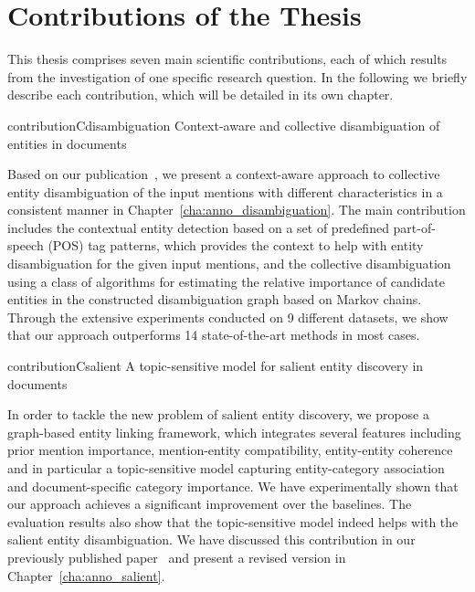\section{Contributions of the Thesis}


This thesis comprises seven main scientific contributions, each of which results from the investigation of one specific research question. In the following we briefly describe each contribution, which will be detailed in its own chapter.

\begin{restatable}{contribution}{Cdisambiguation} \label{c:disambiguation}
Context-aware and collective disambiguation of entities in documents
\end{restatable}
\noindent Based on our publication~\cite{}, we present a context-aware approach to collective entity disambiguation of the input mentions with different characteristics in a consistent manner in Chapter~\ref{cha:anno_disambiguation}. 
The main contribution includes the contextual entity detection based on a set of predefined part-of-speech (POS) tag patterns, which provides the context to help with entity disambiguation for the given input mentions, and the collective disambiguation using a class of algorithms for estimating the relative importance of candidate entities in the constructed disambiguation graph based on Markov chains.
Through the extensive experiments conducted on 9 different datasets, we show that our approach outperforms 14 state-of-the-art methods in most cases.

\begin{restatable}{contribution}{Csalient} \label{c:salient}
A topic-sensitive model for salient entity discovery in documents
\end{restatable}
\vspace{-0.9em}
\noindent In order to tackle the new problem of salient entity discovery, we propose a graph-based entity linking framework, which integrates several features including prior mention importance, mention-entity compatibility, entity-entity coherence and in particular a topic-sensitive model capturing entity-category association and document-specific category importance. We have experimentally shown that our approach achieves a significant improvement over the baselines. The evaluation results also show that the topic-sensitive model indeed helps with the salient entity disambiguation. We have discussed this contribution in our previously published paper~\cite{} and present a revised version in Chapter~\ref{cha:anno_salient}.


